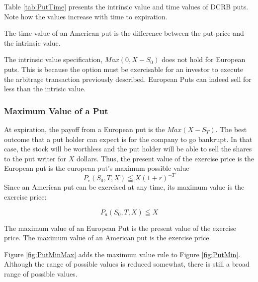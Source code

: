 \documentclass{book}
\theoremstyle{definition}
\theoremstyle{remark}
\begin{document}
            Table \ref{tab:PutTime} presents the intrinsic value and time values of DCRB puts. Note how the values increase with time to expiration. 
            
        \begin{tcolorbox}[colback=blue!5!white,colframe=blue!75!black, title=Sticky Note]
            The time value of an American put is the difference between the put price and the intrinsic value. 
        \end{tcolorbox}            
            
            The intrinsic value specification, $Max(0, X - S_0)$ does not hold for European puts. This is because the option must be exercisable for an investor to execute the arbitrage transaction previously described. European Puts can indeed sell for less than the intrisic value. 
            
        \subsubsection{Maximum Value of a Put}
            At expiration, the payoff from a European put is the $Max(X - S_T)$. The best outcome that a put holder can expect is for the company to go bankrupt. In that case, the stock will be worthless and the put holder will be able to sell the shares to the put writer for $X$ dollars. Thus, the present value of the exercise price is the European put is the european put's maximum possible value 
                \begin{equation}
                    P_e(S_0, T, X) \leqq X(1+r)^{-T}
                \end{equation}
            Since an American put can be exercised at any time, its maximum value is the exercise price: 
                
                \begin{equation}
                    P_a(S_0,T,X) \leqq X
                \end{equation}
                
            
        \begin{tcolorbox}[colback=blue!5!white,colframe=blue!75!black, title=Sticky Note]
            The maximum value of an European Put is the present value of the exercise price. The maximum value of an American put is the exercise price. 
        \end{tcolorbox}             
            
            Figure \ref{fig:PutMinMax} adds the maximum value rule to Figure \ref{fig:PutMin}. Although the range of possible values is reduced somewhat, there is still a broad range of possible values. 
            
\end{document}
